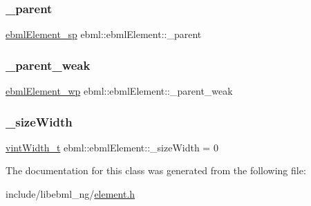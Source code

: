 \mbox{\label{classebml_1_1ebmlElement_a5521124a98cbff8f29e61ecb7f265d6a}} 
\subsubsection{\texorpdfstring{\+\_\+parent}{\_parent}}
{\footnotesize\ttfamily \mbox{\hyperlink{namespaceebml_adad533b7705a16bb360fe56380c5e7be}{ebml\+Element\+\_\+sp}} ebml\+::ebml\+Element\+::\+\_\+parent}

\mbox{\label{classebml_1_1ebmlElement_ac4ae374c7897e4f8800ca6e0e1592bf9}} 
\subsubsection{\texorpdfstring{\+\_\+parent\+\_\+weak}{\_parent\_weak}}
{\footnotesize\ttfamily \mbox{\hyperlink{namespaceebml_a495fb58b42b0050d887415351af02935}{ebml\+Element\+\_\+wp}} ebml\+::ebml\+Element\+::\+\_\+parent\+\_\+weak}

\mbox{\label{classebml_1_1ebmlElement_a57c40a5bbd26c059e9f181d022ce9fe0}} 
\subsubsection{\texorpdfstring{\+\_\+size\+Width}{\_sizeWidth}}
{\footnotesize\ttfamily \mbox{\hyperlink{namespaceebml_a2ccdfb60b23efb51fe07f9d066e23604}{vint\+Width\+\_\+t}} ebml\+::ebml\+Element\+::\+\_\+size\+Width = 0}



The documentation for this class was generated from the following file\+:\begin{DoxyCompactItemize}
\item 
include/libebml\+\_\+ng/\mbox{\hyperlink{element_8h}{element.\+h}}\end{DoxyCompactItemize}
